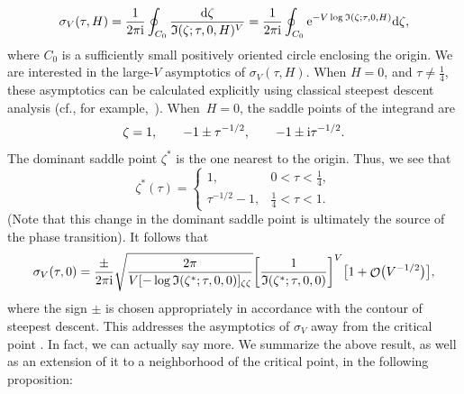 \documentclass[pdftex]{sigma}
\DeclareMathOperator{\OO}{\mathcal{O}}
\numberwithin{equation}{section}
\begin{document}
 \begin{equation}\label{sigma-int}
 \sigma_V(\tau,H) = \frac{1}{2\pi {\rm i}}\oint_{C_0} \frac{{\rm d}\zeta}{\mathfrak{I}(\zeta;\tau,0,H)^V} = \frac{1}{2\pi {\rm i}}\oint_{C_0}{\rm e}^{-V\log\mathfrak{I}(\zeta;\tau,0,H)}{\rm d}\zeta,
 \end{equation}
where $C_0$ is a sufficiently small positively oriented circle enclosing the origin. We are interested in the large-$V$ asymptotics of
$\sigma_V(\tau,H)$. When $H=0$, and $\tau \neq \frac{1}{4}$, these asymptotics can be calculated explicitly using classical
steepest descent analysis (cf., for example,~\cite{Miller}). When~${H=0}$, the saddle points of the integrand are
 \begin{equation*}
 \zeta = 1,\qquad -1 \pm \tau^{-1/2},\qquad -1 \pm {\rm i}\tau^{-1/2}.
 \end{equation*}
The dominant saddle point $\zeta^*$ is the one nearest to the origin. Thus, we see that
 \begin{equation*}
 \zeta^*(\tau) =
 \begin{cases}
 1, & 0 < \tau < \frac{1}{4},\\
 \tau^{-1/2} - 1, & \frac{1}{4} < \tau < 1.
 \end{cases}
 \end{equation*}
(Note that this change in the dominant saddle point is ultimately the source of the phase transition). It follows that
 \begin{equation*}
 \sigma_V(\tau,0) = \frac{\pm}{2\pi {\rm i}}\sqrt{\frac{2\pi}{V[-\log\mathfrak{I}(\zeta^*;\tau,0,0)]_{\zeta\zeta}}}\biggl[\frac{1}{\mathfrak{I}(\zeta^*;\tau,0,0)}\biggr]^V\bigl[1 + \OO\bigl(V^{-1/2}\bigr)\bigr],
 \end{equation*}
where the sign $\pm$ is chosen appropriately in accordance with the contour of steepest descent. This addresses the asymptotics of
$\sigma_V$ away from the critical point . In fact, we can actually say more. We summarize the above result, as well as an extension of it to a neighborhood of the critical point, in the following proposition:
\end{document}
